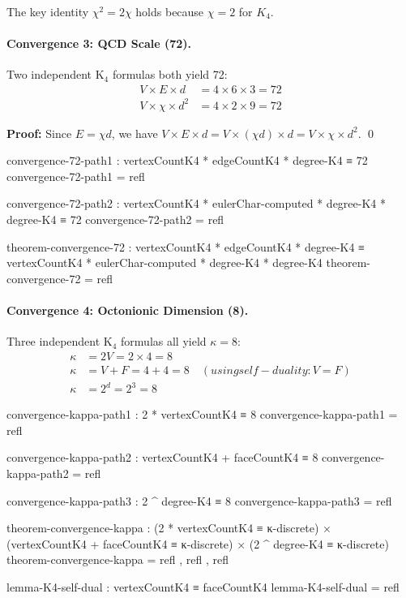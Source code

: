 \documentclass[11pt,a4paper]{book}
\def\text#1{#1}%
\begin{document}
The key identity $\chi^2 = 2\chi$ holds because $\chi = 2$ for $K_4$.

\paragraph{Convergence 3: QCD Scale (72).}

Two independent K$_4$ formulas both yield 72:
\begin{align}
V \times E \times d &= 4 \times 6 \times 3 = 72 \\
V \times \chi \times d^2 &= 4 \times 2 \times 9 = 72
\end{align}

\textbf{Proof:} Since $E = \chi d$, we have $V \times E \times d = V \times (\chi d) \times d = V \times \chi \times d^2$. \qed

\begin{code}
convergence-72-path1 : vertexCountK4 * edgeCountK4 * degree-K4 ≡ 72
convergence-72-path1 = refl

convergence-72-path2 : vertexCountK4 * eulerChar-computed * degree-K4 * degree-K4 ≡ 72
convergence-72-path2 = refl

theorem-convergence-72 : vertexCountK4 * edgeCountK4 * degree-K4 
                       ≡ vertexCountK4 * eulerChar-computed * degree-K4 * degree-K4
theorem-convergence-72 = refl
\end{code}

\paragraph{Convergence 4: Octonionic Dimension (8).}

Three independent K$_4$ formulas all yield $\kappa = 8$:
\begin{align}
\kappa &= 2V = 2 \times 4 = 8 \\
\kappa &= V + F = 4 + 4 = 8 \quad \text{(using self-duality: } V = F \text{)} \\
\kappa &= 2^d = 2^3 = 8
\end{align}

\begin{code}
convergence-kappa-path1 : 2 * vertexCountK4 ≡ 8
convergence-kappa-path1 = refl

convergence-kappa-path2 : vertexCountK4 + faceCountK4 ≡ 8
convergence-kappa-path2 = refl

convergence-kappa-path3 : 2 ^ degree-K4 ≡ 8
convergence-kappa-path3 = refl

theorem-convergence-kappa : (2 * vertexCountK4 ≡ κ-discrete) × 
                            (vertexCountK4 + faceCountK4 ≡ κ-discrete) ×
                            (2 ^ degree-K4 ≡ κ-discrete)
theorem-convergence-kappa = refl , refl , refl

lemma-K4-self-dual : vertexCountK4 ≡ faceCountK4
lemma-K4-self-dual = refl
\end{code}
\end{document}
